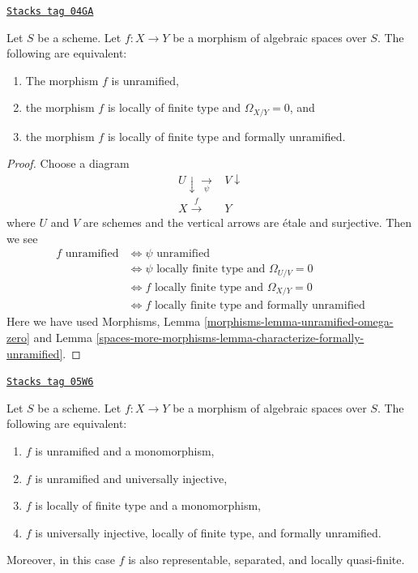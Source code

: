 \begin{lemma}
\label{spaces-more-morphisms-lemma-unramified-formally-unramified}
\href{https://stacks.math.columbia.edu/tag/04GA}{\texttt{Stacks tag 04GA}}

Let $S$ be a scheme.
Let $f : X \to Y$ be a morphism of algebraic spaces over $S$.
The following are equivalent:
\begin{enumerate}
\item The morphism $f$ is unramified,
\item the morphism $f$ is locally of finite type and $\Omega_{X/Y} = 0$, and
\item the morphism $f$ is locally of finite type and formally unramified.
\end{enumerate}
\end{lemma}

\begin{proof}
Choose a diagram
$$
\begin{array}{cc}U \downarrow\underset{\psi}{\longrightarrow} & V \downarrow \\ X \overset{f}{\longrightarrow} & Y\end{array}
$$
where $U$ and $V$ are schemes and the vertical arrows are \'etale and
surjective. Then we see
\begin{align*}
f\text{ unramified}
& \Leftrightarrow
\psi\text{ unramified} \\
& \Leftrightarrow
\psi\text{ locally finite type and }\Omega_{U/V} = 0 \\
& \Leftrightarrow
f\text{ locally finite type and }\Omega_{X/Y} = 0 \\
& \Leftrightarrow
f\text{ locally finite type and formally unramified}
\end{align*}
Here we have used
Morphisms, Lemma \ref{morphisms-lemma-unramified-omega-zero} and
Lemma \ref{spaces-more-morphisms-lemma-characterize-formally-unramified}.
\end{proof}

\begin{lemma}
\label{spaces-more-morphisms-lemma-universally-injective-unramified}
\href{https://stacks.math.columbia.edu/tag/05W6}{\texttt{Stacks tag 05W6}}

Let $S$ be a scheme.
Let $f : X \to Y$ be a morphism of algebraic spaces over $S$.
The following are equivalent:
\begin{enumerate}
\item $f$ is unramified and a monomorphism,
\item $f$ is unramified and universally injective,
\item $f$ is locally of finite type and a monomorphism,
\item $f$ is universally injective, locally of finite type, and
formally unramified.
\end{enumerate}
Moreover, in this case $f$ is also representable, separated, and
locally quasi-finite.
\end{lemma}

